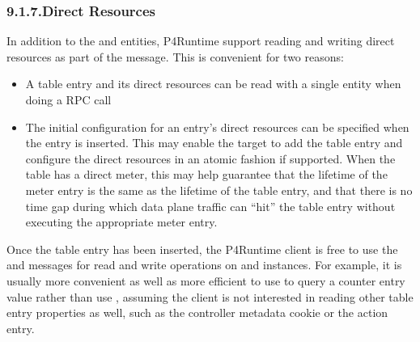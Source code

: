 \documentclass[11pt]{article}
\begin{document}
{%
\subsubsection{9.1.7.\hspace*{0.5em}Direct Resources}\label{sec-direct-resources}%

\noindent{}In addition to the  and  entities,
P4Runtime support reading and writing direct resources as part of the
 message.  This is convenient for two reasons:%

\begin{itemize}%

\item{}
A table entry and its direct resources can be read with a single entity when
doing a  RPC call%

\item{}
The initial configuration for an entry's direct resources can be specified
when the entry is inserted. This may enable the target to add the table entry
and configure the direct resources in an atomic fashion if supported. When the
table has a direct meter, this may help guarantee that the lifetime of the
meter entry is the same as the lifetime of the table entry, and that there is
no time gap during which data plane traffic can \textquotedblleft{}hit\textquotedblright{} the table entry without
executing the appropriate meter entry.%
\end{itemize}%

\noindent{}Once the table entry has been inserted, the P4Runtime client is free to use the
 and  messages for read and write
operations on  and  instances. For example, it is
usually more convenient as well as more efficient to use  to
query a counter entry value rather than use , assuming the client is
not interested in reading other table entry properties as well, such as the
controller metadata cookie or the action entry.%

}
\end{document}
